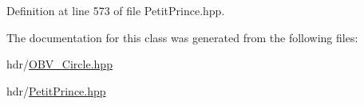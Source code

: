 Definition at line 573 of file Petit\+Prince.\+hpp.



The documentation for this class was generated from the following files\+:\begin{DoxyCompactItemize}
\item 
hdr/\hyperlink{_o_b_v___circle_8hpp}{O\+B\+V\+\_\+\+Circle.\+hpp}\item 
hdr/\hyperlink{_petit_prince_8hpp}{Petit\+Prince.\+hpp}\end{DoxyCompactItemize}

